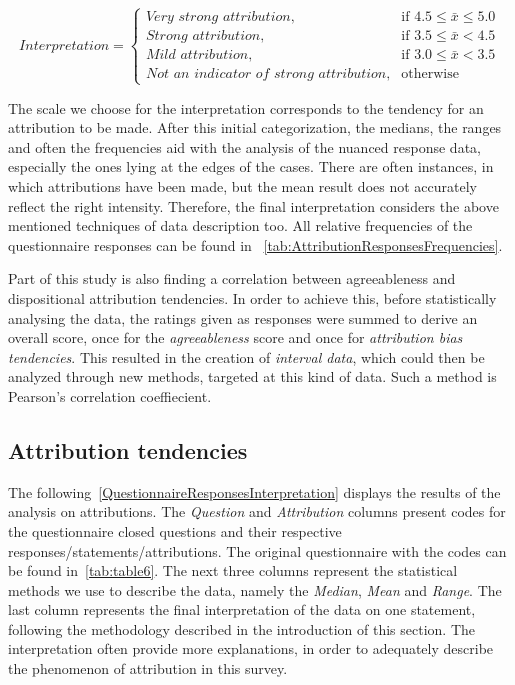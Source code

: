 \begin{equation} \label{Interpretation}
Interpretation =
    \begin{cases}
      \textit{Very strong attribution,} & \text{if } 4.5 \leq \bar{x} \leq 5.0 \\
      \textit{Strong attribution,} & \text{if } 3.5 \leq \bar{x} < 4.5 \\
      \textit{Mild attribution,} & \text{if } 3.0 \leq \bar{x} < 3.5 \\
      \textit{Not an indicator of strong attribution,} & \text{otherwise}
    \end{cases}       
\end{equation}

The scale we choose for the interpretation corresponds to the tendency for an attribution to be made. After this initial categorization, the medians, the ranges and often the frequencies aid with the analysis of the nuanced response data, especially the ones lying at the edges of the cases. There are often instances, in which attributions have been made, but the mean result does not accurately reflect the right intensity. Therefore, the final interpretation considers the above mentioned techniques of data description too. All relative frequencies of the questionnaire responses can be found in ~\autoref{tab:AttributionResponsesFrequencies}.

Part of this study is also finding a correlation between agreeableness and dispositional attribution tendencies. In order to achieve this, before statistically analysing the data, the ratings given as responses were summed to derive an overall score, once for the \textit{agreeableness} score and once for \textit{attribution bias tendencies}. This resulted in the creation of \textit{interval data}, which could then be analyzed through new methods, targeted at this kind of data. Such a method is Pearson's correlation coeffiecient.

\subsection{Attribution tendencies}

The following~\autoref{QuestionnaireResponsesInterpretation} displays the results of the analysis on attributions. The \textit{Question} and \textit{Attribution} columns present codes for the questionnaire closed questions and their respective responses/statements/attributions. The original questionnaire with the codes can be found in~\autoref{tab:table6}. The next three columns represent the statistical methods we use to describe the data, namely the \textit{Median}, \textit{Mean} and \textit{Range}. The last column represents the final interpretation of the data on one statement, following the methodology described in the introduction of this section. The interpretation often provide more explanations, in order to adequately describe the phenomenon of attribution in this survey.


